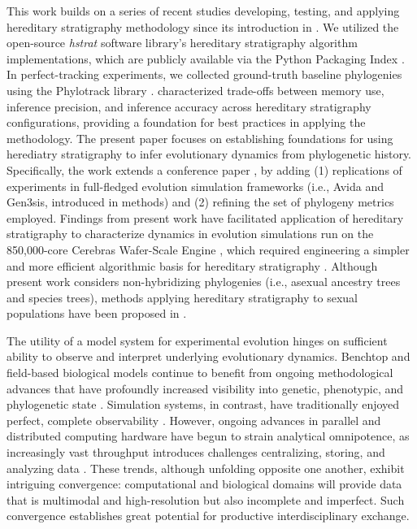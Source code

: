 This work builds on a series of recent studies developing, testing, and applying hereditary stratigraphy methodology since its introduction in \citet{moreno2022hereditary}.
We utilized the open-source \textit{hstrat} software library's hereditary stratigraphy algorithm implementations, which are publicly available via the Python Packaging Index \citep{moreno2022hstrat}.
In perfect-tracking experiments, we collected ground-truth baseline phylogenies using the Phylotrack library \citep{dolson2024phylotrack}. 
\citet{moreno2024guide} characterized trade-offs between memory use, inference precision, and inference accuracy across hereditary stratigraphy configurations, providing a foundation for best practices in applying the methodology.
The present paper focuses on establishing foundations for using herediatry stratigraphy to infer evolutionary dynamics from phylogenetic history.
Specifically, the work extends a conference paper \citet{moreno2023toward}, by adding (1) replications of experiments in full-fledged evolution simulation frameworks (i.e., Avida and Gen3sis, introduced in methods) and (2) refining the set of phylogeny metrics employed.
Findings from present work have facilitated application of hereditary stratigraphy to characterize dynamics in evolution simulations run on the 850,000-core Cerebras Wafer-Scale Engine \citep{moreno2024trackable}, which required engineering a simpler and more efficient algorithmic basis for hereditary stratigraphy \citep{moreno2024structured}.
Although present work considers non-hybridizing phylogenies (i.e., asexual ancestry trees and species trees), methods applying hereditary stratigraphy to sexual populations have been proposed in \citet{moreno2024methods}.

The utility of a model system for experimental evolution hinges on sufficient ability to observe and interpret underlying evolutionary dynamics.
Benchtop and field-based biological models continue to benefit from ongoing methodological advances that have profoundly increased visibility into genetic, phenotypic, and phylogenetic state \citep{woodworth2017building,blomberg2011measuring,schneider2019past}.
Simulation systems, in contrast, have traditionally enjoyed perfect, complete observability \citep{hindre2012new}.
However, ongoing advances in parallel and distributed computing hardware have begun to strain analytical omnipotence, as increasingly vast throughput introduces challenges centralizing, storing, and analyzing data \citep{klasky2021data}.
These trends, although unfolding opposite one another, exhibit intriguing convergence: computational and biological domains will provide data that is multimodal and high-resolution but also incomplete and imperfect.
Such convergence establishes great potential for productive interdisciplinary exchange.

